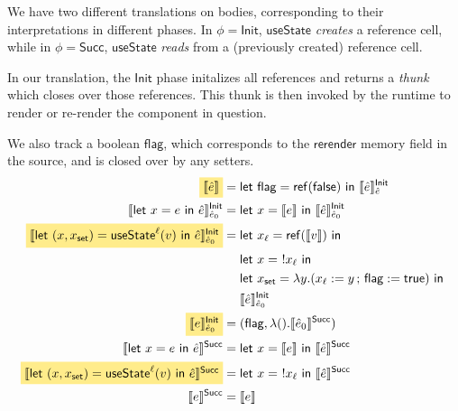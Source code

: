 \documentclass{article}
\newcommand{\mf}[1]{\mathsf{#1}}
\newcommand{\semi}{\,;\,}
\newcommand{\mhl}[1]{\colorbox{LightGoldenrod1}{$#1$}}
\newcommand{\llrr}[1]{\llbracket #1 \rrbracket}
\newcommand{\elet}[3]{\mf{let}\ #1 = #2\ \mf{in}\ #3}
\newcommand{\estate}[4]{\mf{let}\ (#1, #1_{\mf{set}}) = \mf{useState}^{#2}(#3)\ \mf{in}\ #4}
\newcommand{\eref}[1]{\mf{ref}(#1)}
\newcommand{\eget}[1]{\ !#1}
\newcommand{\eset}[2]{#1 := #2}
\begin{document}
We have two different translations on bodies,
corresponding to their interpretations in different phases.
In $\phi=\mf{Init}$, $\mf{useState}$ \emph{creates} a reference cell,
while in $\phi=\mf{Succ}$, $\mf{useState}$ \emph{reads}
from a (previously created) reference cell.

In our translation, the $\mf{Init}$ phase initalizes all references
and returns a \emph{thunk} which closes over those references.
This thunk is then invoked by the runtime to render or re-render
the component in question.

We also track a boolean $\mf{flag}$, which corresponds to the
$\mf{rerender}$ memory field in the source, and is closed
over by any setters.
\begin{align*}
\mhl{\llrr{\hat{e}}} &= \elet{\mf{flag}}{\eref{\mf{false}}}
{\llrr{\hat{e}}^\mf{Init}_{\hat{e}}}\\
\llrr{\elet{x}{e}{\hat{e}}}^\mf{Init}_{\hat{e}_0}
&= \elet{x}{\llrr{e}}{\llrr{\hat{e}}^\mf{Init}_{\hat{e}_0}}\\
\mhl{\llrr{\estate{x}{\ell}{v}{\hat{e}}}^\mf{Init}_{\hat{e}_0}}
&= \elet{x_\ell}{\eref{\llrr{v}}}{\\
  &\quad\ \elet{x}{\eget{x_\ell}}{\\
    &\quad\ \elet{x_\mf{set}}{\lambda y.(\eset{x_\ell}{y} 
    \semi \eset{\mf{flag}}{\mf{true}})}{\\
      &\quad\ \llrr{\hat{e}}^\mf{Init}_{\hat{e}_0}}
  }
}\\
\mhl{\llrr{e}^\mf{Init}_{\hat{e}_0}}
&= (\mf{flag}, \lambda ().\llrr{\hat{e}_0}^\mf{Succ})\\
\llrr{\elet{x}{e}{\hat{e}}}^\mf{Succ}
&= \elet{x}{\llrr{e}}{\llrr{\hat{e}}^\mf{Succ}}\\
\mhl{\llrr{\estate{x}{\ell}{v}{\hat{e}}}^\mf{Succ}}
&= \elet{x}{\eget{x_\ell}}{\llrr{\hat{e}}^\mf{Succ}}\\
\llrr{e}^\mf{Succ} &= \llrr{e}
\end{align*}
\end{document}
